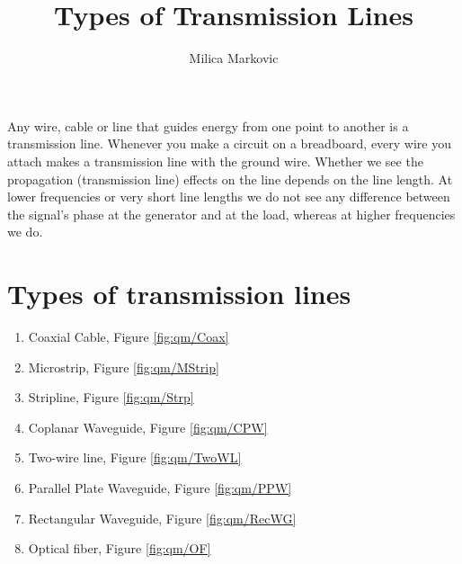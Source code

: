 \documentclass{ximera}
\title{Types of Transmission Lines}
\author{Milica Markovic}
\begin{document}
  
\begin{abstract}  

\end{abstract}  
\maketitle    






Any wire, cable or line that guides energy from one point to another
is a transmission line. Whenever you make a circuit on a breadboard,
every wire you attach makes  a transmission line with the ground wire. Whether we see the propagation (transmission line) effects on the
line depends on the line length. 
At lower frequencies or very short line lengths we do not
see any difference between the signal's phase at the generator and at the load,
whereas at higher frequencies we do.








\section{Types of transmission lines}

\begin{enumerate}
\item Coaxial Cable, Figure \ref{fig:qm/Coax}
\item Microstrip, Figure \ref{fig:qm/MStrip}
\item Stripline, Figure \ref{fig:qm/Strp}
\item Coplanar Waveguide, Figure \ref{fig:qm/CPW}
\item Two-wire line, Figure \ref{fig:qm/TwoWL}
\item Parallel Plate Waveguide, Figure \ref{fig:qm/PPW}
\item Rectangular Waveguide, Figure \ref{fig:qm/RecWG}
\item Optical fiber, Figure \ref{fig:qm/OF}
\end{enumerate}
\end{document}
